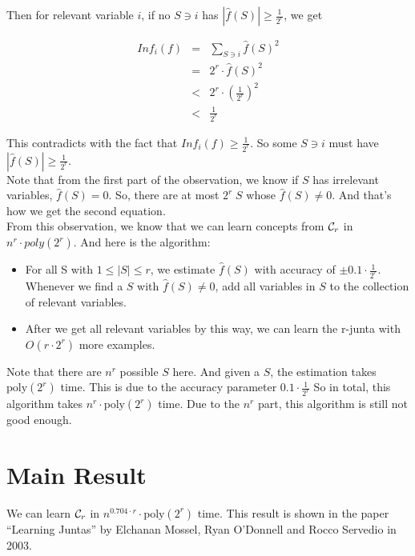\documentclass[12pt]{article}
\newcommand{\calc}{{\cal C}}
\newcommand{\poly}{\mathrm{poly}}
\begin{document}
Then for relevant variable $i$, if no $S \ni i$ has $|\hat {f}(S)| \ge
\frac {1}{2^r}$, we get

\begin{eqnarray*}
Inf_i(f)
&=& \sum_{S \ni i} \hat {f}(S)^2 \\
&=& 2^r \cdot \hat {f}(S)^2 \\
&<& 2^r \cdot (\frac{1}{2^r})^2 \\
&<& \frac {1}{2^r}
\end{eqnarray*}

This contradicts with the fact that $Inf_i(f) \ge \frac{1}{2^r}$. So
some $S \ni i$ must have $|\hat {f}(S)| \ge \frac {1}{2^r}$. \\

Note that from the first part of the observation, we know if $S$ has
irrelevant variables, $\hat {f}(S) = 0$. So, there are at most 
$2^r \; S$ whose $\hat {f}(S) \neq 0$. And that's how we get the
second equation. \\

From this observation, we know that we can learn concepts from
$\calc_r$ in $n^r \cdot poly(2^r)$. And here is the algorithm:

\begin{itemize}
\item For all S with $1 \le |S| \le r$, we estimate $\hat {f}(S)$
  with accuracy of $\pm 0.1 \cdot \frac {1}{2^r}$. Whenever we find
  a $S$ with $\hat {f}(S) \neq 0$, add all variables in $S$ to the
  collection of relevant variables.
\item After we get all relevant variables by this way, we can learn
  the r-junta with $O(r \cdot 2^r)$ more examples.
\end{itemize}

Note that there are $n^r$ possible $S$ here. And given a $S$, the
estimation takes $\poly (2^r)$ time. This is due to the accuracy
parameter $0.1 \cdot \frac {1}{2^r}$ So in total, this algorithm takes
$n^r \cdot \poly (2^r)$ time. Due to the $n^r$ part, this algorithm is
still not good enough.

\section{Main Result}

We can learn $\calc_r$ in $n^{0.704 \cdot r} \cdot \poly(2^r)$
time. This result is shown in the paper ``Learning Juntas'' by
Elchanan Mossel, Ryan O'Donnell and Rocco Servedio in 2003. \\
\end{document}
